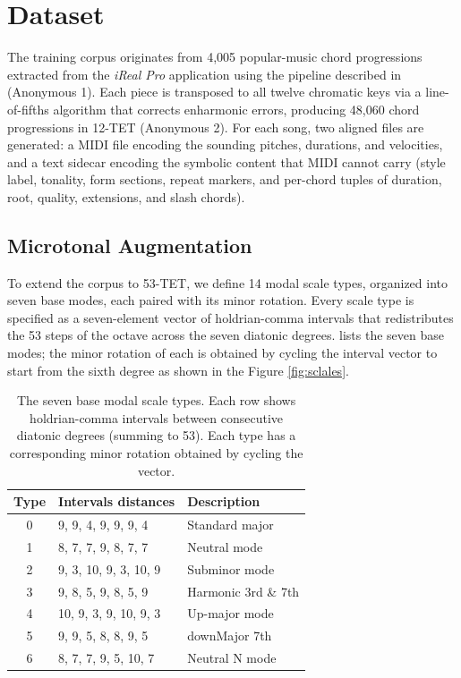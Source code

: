 \documentclass{aimc2026}
\begin{document}
\section{Dataset}
\label{sec:dataset}

The training corpus originates from 4,005 popular-music chord progressions extracted from the \textit{iReal Pro} application using the pipeline described in (Anonymous 1). Each piece is transposed to all twelve chromatic keys via a line-of-fifths algorithm that corrects enharmonic errors, producing 48,060 chord progressions in 12-TET (Anonymous 2). For each song, two aligned files are generated: a MIDI file encoding the sounding pitches, durations, and velocities, and a text sidecar encoding the symbolic content that MIDI cannot carry (style label, tonality, form sections, repeat markers, and per-chord tuples of duration, root, quality, extensions, and slash chords).

\subsection{Microtonal Augmentation}
\label{sec:augmentation}

To extend the corpus to 53-TET, we define 14 modal scale types, organized into seven base modes, each paired with its minor rotation. Every scale type is specified as a seven-element vector of holdrian-comma intervals that redistributes the 53 steps of the octave across the seven diatonic degrees.  lists the seven base modes; the minor rotation of each is obtained by cycling the interval vector to start from the sixth degree as shown in the Figure \ref{fig:sclales}.

\begin{table}[]
  \caption{The seven base modal scale types. Each row shows holdrian-comma intervals between consecutive diatonic degrees (summing to 53). Each type has a corresponding minor rotation obtained by cycling the vector.}
  \label{tab:scale_types}
  \centering
  \small
  \begin{tabular}{@{}cll@{}}
    \toprule
    Type & Intervals distances & Description \\
    \midrule
    0 & 9, 9, 4, 9, 9, 9, 4 & Standard major \\
    1 & 8, 7, 7, 9, 8, 7, 7 & Neutral mode \\
    2 & 9, 3, 10, 9, 3, 10, 9 & Subminor mode \\
    3 & 9, 8, 5, 9, 8, 5, 9 & Harmonic 3rd \& 7th \\
    4 & 10, 9, 3, 9, 10, 9, 3 & Up-major mode \\
    5 & 9, 9, 5, 8, 8, 9, 5 & downMajor 7th \\
    6 & 8, 7, 7, 9, 5, 10, 7 & Neutral N mode \\
    \bottomrule
  \end{tabular}
\end{table}
\end{document}
